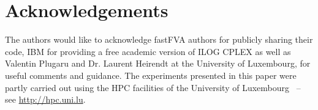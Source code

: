 \section*{Acknowledgements}
The authors would like to acknowledge fastFVA authors for publicly sharing their code, IBM for providing a free academic version of ILOG CPLEX as well as Valentin Plugaru and Dr. Laurent Heirendt at the University of Luxembourg, for useful comments and guidance. The experiments presented in this paper were partly carried out
using the HPC facilities of the University of Luxembourg~\cite{VBCG_HPCS14} 
{\small -- see \url{http://hpc.uni.lu}}.